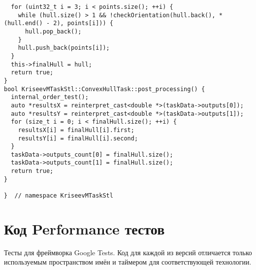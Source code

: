 \documentclass[a4paper]{article}
\begin{document}
\begin{lstlisting}
  for (uint32_t i = 3; i < points.size(); ++i) {
    while (hull.size() > 1 && !checkOrientation(hull.back(), *(hull.end() - 2), points[i])) {
      hull.pop_back();
    }
    hull.push_back(points[i]);
  }
  this->finalHull = hull;
  return true;
}
bool KriseevMTaskStl::ConvexHullTask::post_processing() {
  internal_order_test();
  auto *resultsX = reinterpret_cast<double *>(taskData->outputs[0]);
  auto *resultsY = reinterpret_cast<double *>(taskData->outputs[1]);
  for (size_t i = 0; i < finalHull.size(); ++i) {
    resultsX[i] = finalHull[i].first;
    resultsY[i] = finalHull[i].second;
  }
  taskData->outputs_count[0] = finalHull.size();
  taskData->outputs_count[1] = finalHull.size();
  return true;
}

}  // namespace KriseevMTaskStl
\end{lstlisting}

\section{Код Performance тестов}

Тесты для фреймворка Google Tests. Код для каждой из версий отличается 
только используемым пространством имён и таймером для соответствующей технологии.
\end{document}
